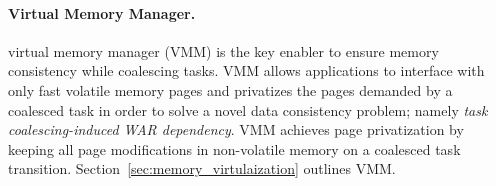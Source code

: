 \paragraph{Virtual Memory Manager.}
\sys virtual memory manager (VMM) is the key enabler to ensure memory consistency while coalescing tasks. VMM allows applications to interface with only fast volatile memory pages and privatizes the pages demanded by a coalesced task in order to solve a novel data consistency problem; namely \emph{task coalescing-induced WAR dependency}. VMM achieves page privatization by keeping all page modifications in non-volatile memory on a coalesced task transition. Section~\ref{sec:memory_virtulaization} outlines VMM.